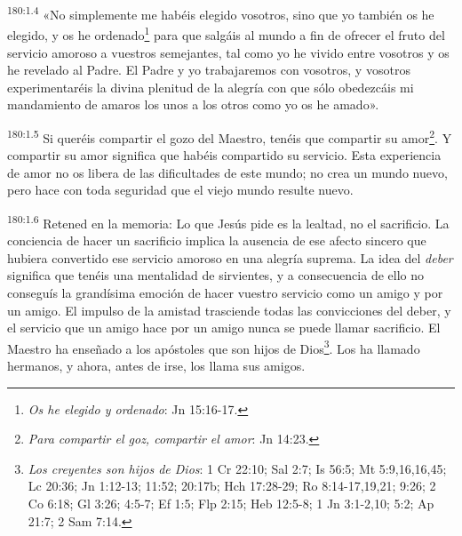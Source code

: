\par
\textsuperscript{180:1.4} «No simplemente me habéis elegido vosotros, sino que yo también os he elegido, y os he ordenado\footnote{\textit{Os he elegido y ordenado}: Jn 15:16-17.} para que salgáis al mundo a fin de ofrecer el fruto del servicio amoroso a vuestros semejantes, tal como yo he vivido entre vosotros y os he revelado al Padre. El Padre y yo trabajaremos con vosotros, y vosotros experimentaréis la divina plenitud de la alegría con que sólo obedezcáis mi mandamiento de amaros los unos a los otros como yo os he amado».

\par
\textsuperscript{180:1.5} Si queréis compartir el gozo del Maestro, tenéis que compartir su amor\footnote{\textit{Para compartir el goz, compartir el amor}: Jn 14:23.}. Y compartir su amor significa que habéis compartido su servicio. Esta experiencia de amor no os libera de las dificultades de este mundo; no crea un mundo nuevo, pero hace con toda seguridad que el viejo mundo resulte nuevo.

\par
\textsuperscript{180:1.6} Retened en la memoria: Lo que Jesús pide es la lealtad, no el sacrificio. La conciencia de hacer un sacrificio implica la ausencia de ese afecto sincero que hubiera convertido ese servicio amoroso en una alegría suprema. La idea del \textit{deber} significa que tenéis una mentalidad de sirvientes, y a consecuencia de ello no conseguís la grandísima emoción de hacer vuestro servicio como un amigo y por un amigo. El impulso de la amistad trasciende todas las convicciones del deber, y el servicio que un amigo hace por un amigo nunca se puede llamar sacrificio. El Maestro ha enseñado a los apóstoles que son hijos de Dios\footnote{\textit{Los creyentes son hijos de Dios}: 1 Cr 22:10; Sal 2:7; Is 56:5; Mt 5:9,16,16,45; Lc 20:36; Jn 1:12-13; 11:52; 20:17b; Hch 17:28-29; Ro 8:14-17,19,21; 9:26; 2 Co 6:18; Gl 3:26; 4:5-7; Ef 1:5; Flp 2:15; Heb 12:5-8; 1 Jn 3:1-2,10; 5:2; Ap 21:7; 2 Sam 7:14.}. Los ha llamado hermanos, y ahora, antes de irse, los llama sus amigos.

